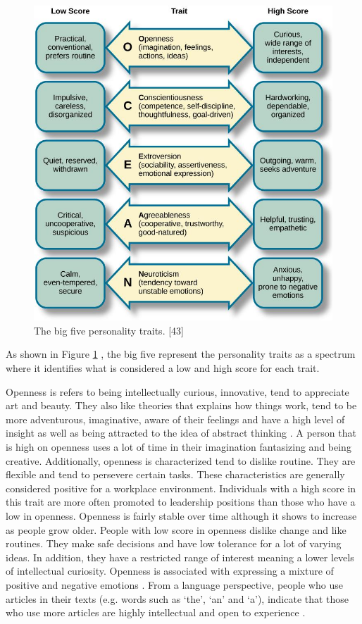 \begin{figure}[h]
  \centering
  \includegraphics[width=\textwidth]{figures/big-5-personality.jpeg}
  \caption{The big five personality traits. [43]}
  \label{fig:big5}
\end{figure}
%
As shown in Figure \ref{fig:big5} \cite{big5-image}, the big five  represent the personality traits as a spectrum where it identifies what is considered a low and high score for each trait.

Openness is refers to being intellectually curious, innovative, tend to appreciate art and beauty. They also like theories that explains how things work, tend to be more adventurous, imaginative, aware of their feelings and have a high level of insight as well as being attracted to the idea of abstract thinking \cite{big-five-john1999big}. A person that is high on openness uses a lot of time in their imagination fantasizing and being creative. Additionally,  openness is characterized tend to dislike routine. They are flexible and tend to persevere certain tasks. These characteristics are generally considered positive for a workplace environment. Individuals with a high score in this trait are more often promoted to leadership positions than those who have a low in openness. Openness is fairly stable over time although it shows to increase as people grow older. People with low score in openness dislike change and like routines. They make safe decisions and have low tolerance for a lot of varying ideas. In addition, they have a restricted range of interest meaning a lower levels of intellectual curiosity. Openness is associated with expressing a mixture of positive and negative emotions \cite{openness1-BARFORD2016118}. From a language perspective, people who use articles in their texts (e.g. words such as ‘the’, ‘an’ and ‘a’), indicate that those who use more articles are highly intellectual and open to experience \cite{openness2-fast2008personality}.  

